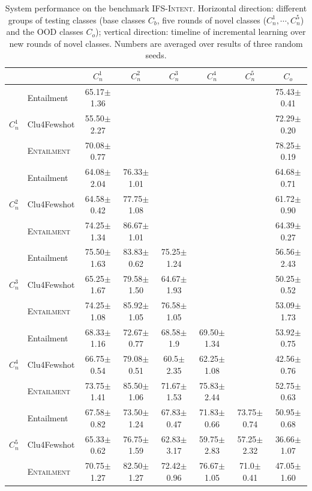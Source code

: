 \documentclass[11pt]{article}
\newcommand{\modelname}{\textsc{Entailment}}
\newcommand{\intentdata}{\textsc{IFS-Intent}}
\begin{document}
\begin{table}[t]
\setlength{\tabcolsep}{4.5pt}
\small
  \centering
  \begin{tabular}{ll|c|c|c|c|c|c}
 &  & $C_n^1$ & $C_n^2$ & $C_n^3$ & $C_n^4$ & $C_n^5$ & $C_o$\\\hline\hline 

 \multirow{3}{*}{$C_n^1$} &  Entailment &65.17$\pm$1.36 & & & & &75.43$\pm$0.41 \\
  &  Clu4Fewshot & 55.50$\pm$2.27 & & & & & 72.29$\pm$0.20\\
  &  \modelname & 70.08$\pm$0.77 & & & & & 78.25$\pm$0.19\\\hline

 \multirow{3}{*}{$C_n^2$} &  Entailment &64.08$\pm$2.04 &76.33$\pm$1.01 & & & &64.68$\pm$0.71\\
  &  Clu4Fewshot &64.58$\pm$0.42 &77.75$\pm$1.08 & & & & 61.72$\pm$0.90\\
  &  \modelname & 74.25$\pm$1.34 &86.67$\pm$1.01 & & & &64.39$\pm$0.27 \\\hline
 
  \multirow{3}{*}{$C_n^3$} &  Entailment &75.50$\pm$1.63 &83.83$\pm$0.62 &75.25$\pm$1.24 & & &56.56$\pm$2.43 \\
  &  Clu4Fewshot & 65.25$\pm$1.67 &79.58$\pm$1.50 &64.67$\pm$1.93 & & & 50.25$\pm$0.52\\
  &  \modelname & 74.25$\pm$1.08 & 85.92$\pm$1.05& 76.58$\pm$1.05& & &53.09$\pm$1.73 \\\hline
  
   \multirow{3}{*}{$C_n^4$} &  Entailment &68.33$\pm$1.16 &72.67$\pm$0.77 &68.58$\pm$1.9 & 69.50$\pm$1.34& &53.92$\pm$0.75\\
  &  Clu4Fewshot &66.75$\pm$0.54 &79.08$\pm$0.51 & 60.5$\pm$2.35& 62.25$\pm$1.08& &  42.56$\pm$0.76\\
  &  \modelname & 73.75$\pm$1.41 &85.50$\pm$1.06 & 71.67$\pm$1.53& 75.83$\pm$2.44& & 52.75$\pm$0.63\\\hline
  
   \multirow{3}{*}{$C_n^5$} &  Entailment &67.58$\pm$0.82 & 73.50$\pm$1.24& 67.83$\pm$0.47& 71.83$\pm$0.66& 73.75$\pm$0.74&50.95$\pm$0.68 \\
  &  Clu4Fewshot &65.33$\pm$0.62 & 76.75$\pm$1.59& 62.83$\pm$3.17&59.75$\pm$2.83 &57.25$\pm$2.32 & 36.66$\pm$1.07\\
  &  \modelname &70.75$\pm$1.27 &82.50$\pm$1.27 & 72.42$\pm$0.96&76.67$\pm$1.05 & 71.0$\pm$0.41& 47.05$\pm$1.60\\\hline
\end{tabular}
\caption{System performance on the benchmark \intentdata. Horizontal direction: different groups of testing classes (base classes $C_b$, five rounds of novel classes ($C_n^1, \cdots, C_n^5$) and the OOD classes $C_o$); vertical direction: timeline of incremental learning over new rounds of novel classes.  Numbers are averaged over results of three random seeds.}\label{tab:intentresults_withoutbase}
\end{table}
\end{document}
